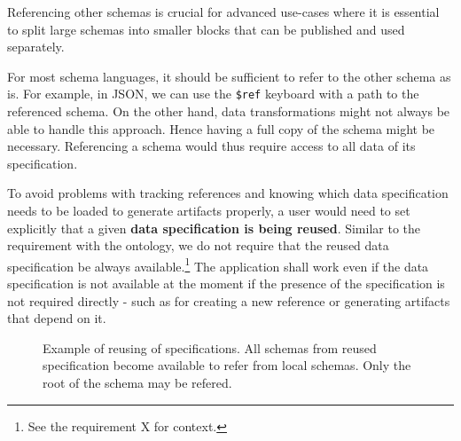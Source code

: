 Referencing other schemas is crucial for advanced use-cases where it is essential to split large schemas into smaller blocks that can be published and used separately.

For most schema languages, it should be sufficient to refer to the other schema as is. For example, in JSON, we can use the \verb|$ref| keyboard with a path to the referenced schema. On the other hand, data transformations might not always be able to handle this approach. Hence having a full copy of the schema might be necessary. Referencing a schema would thus require access to all data of its specification.

To avoid problems with tracking references and knowing which data specification needs to be loaded to generate artifacts properly, a user would need to set explicitly that a given \textbf{data specification is being reused}. Similar to the requirement with the ontology, we do not require that the reused data specification be always available.\footnote{See the requirement X for context.} The application shall work even if the data specification is not available at the moment if the presence of the specification is not required directly - such as for creating a new reference or generating artifacts that depend on it.

\begin{figure}[h!]\centering
    \caption{Example of reusing of specifications. All schemas from reused specification become available to refer from local schemas. Only the root of the schema may be refered.}
\end{figure}